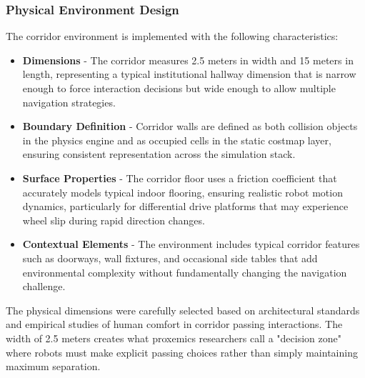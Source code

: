 \subsubsection{Physical Environment Design}
The corridor environment is implemented with the following characteristics:
\begin{itemize}
    \item \textbf{Dimensions} - The corridor measures 2.5 meters in width and 15 meters in 
    length, representing a typical institutional hallway dimension that is narrow enough to 
    force interaction decisions but wide enough to allow multiple navigation strategies.
    \item \textbf{Boundary Definition} - Corridor walls are defined as both collision objects 
    in the physics engine and as occupied cells in the static costmap layer, ensuring consistent 
    representation across the simulation stack.
    \item \textbf{Surface Properties} - The corridor floor uses a friction coefficient that 
    accurately models typical indoor flooring, ensuring realistic robot motion dynamics, 
    particularly for differential drive platforms that may experience wheel slip during 
    rapid direction changes.
    \item \textbf{Contextual Elements} - The environment includes typical corridor features 
    such as doorways, wall fixtures, and occasional side tables that add environmental complexity 
    without fundamentally changing the navigation challenge.
\end{itemize}
The physical dimensions were carefully selected based on architectural standards and 
empirical studies of human comfort in corridor passing interactions. The width of 2.5 meters 
creates what proxemics researchers call a "decision zone" where robots must make explicit 
passing choices rather than simply maintaining maximum separation.

